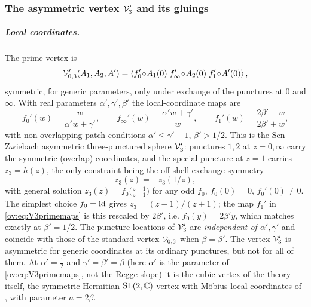 \subsubsection{The asymmetric vertex \texorpdfstring{${\mathcal{V}}_3'$}{V3'} and its gluings}
\label{ov:sec:explicit:V3}

\subparagraph{Local coordinates.} The prime vertex is
\begin{equation}
	{\mathcal{V}}_{0,3}'(A_1,A_2,A') = \left \langle f_0'\!\circ\! A_1(0)\; f_\infty'\!\circ\! A_2(0)\;
	f_1'\!\circ\! A'(0) \right \rangle,
	\label{ov:eq:V3prime}
\end{equation}
symmetric, for generic parameters, only under exchange of the punctures at $0$ and $\infty$. With real parameters
$\alpha',\gamma',\beta'$ the local-coordinate maps are
\begin{equation}
	f_0'(w)=\frac{w}{\alpha'w+\gamma'},\qquad
	f_\infty'(w)=\frac{\alpha'w+\gamma'}{w},\qquad
	f_1'(w)=\frac{2\beta'-w}{2\beta'+w},
	\label{ov:eq:V3primemaps}
\end{equation}
with non-overlapping patch conditions $\alpha'\le\gamma'-1$, $\beta'>1/2$. This is the
Sen--Zwiebach \cite{SenZwiebach1994} asymmetric three-punctured sphere ${\mathcal{V}}_3'$: punctures
$1,2$ at $z=0,\infty$ carry the symmetric (overlap) coordinates, and the special puncture at
$z=1$ carries $z_3=h(z)$, the only constraint being the off-shell exchange symmetry
\begin{equation}
	z_3(z)=-z_3(1/z),
	\label{ov:eq:exchange}
\end{equation}
with general solution $z_3(z)=f_0\!\big(\tfrac{z-1}{z+1}\big)$ for any odd $f_0$,
$f_0(0)=0$, $f_0'(0)\ne0$. The simplest choice $f_0=\mathrm{id}$ gives $z_3=(z-1)/(z+1)$; the map
$f_1'$ in \eqref{ov:eq:V3primemaps} is this rescaled by $2\beta'$, i.e.
$f_0(y)=2\beta'y$, which matches exactly at $\beta'=1/2$. The puncture locations of
${\mathcal{V}}_3'$ are \emph{independent of $\alpha',\gamma'$} and coincide with those of the standard
vertex ${\mathcal{V}}_{0,3}$ when $\beta=\beta'$.
The vertex ${\mathcal{V}}_3'$ is asymmetric for generic coordinates at its ordinary punctures, but not for all of them.
At $\alpha'=\tfrac12$ and $\gamma'=\beta'=\beta$ (here $\alpha'$ is the parameter of \eqref{ov:eq:V3primemaps}, not the Regge slope) it is the cubic vertex of the theory itself, the symmetric Hermitian $\mathrm{SL}(2,\mathbb{C})$ vertex with Möbius local coordinates of \cite{Sonoda:1990:CovariantClosedString}, with parameter $a=2\beta$.


